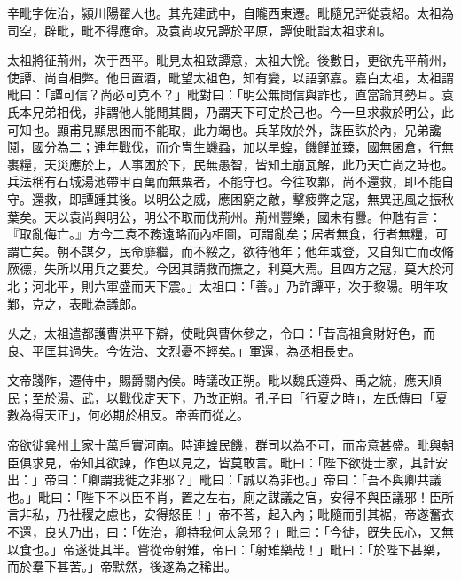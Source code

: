 \begin{pinyinscope}
 
 
 辛毗字佐治，潁川陽翟人也。其先建武中，自隴西東遷。毗隨兄評從袁紹。太祖為司空，辟毗，毗不得應命。及袁尚攻兄譚於平原，譚使毗詣太祖求和。
 
 
 太祖將征荊州，次于西平。毗見太祖致譚意，太祖大恱。後數日，更欲先平荊州，使譚、尚自相弊。他日置酒，毗望太祖色，知有變，以語郭嘉。嘉白太祖，太祖謂毗曰：「譚可信？尚必可克不？」毗對曰：「明公無問信與詐也，直當論其勢耳。袁氏本兄弟相伐，非謂他人能閒其間，乃謂天下可定於己也。今一旦求救於明公，此可知也。顯甫見顯思困而不能取，此力竭也。兵革敗於外，謀臣誅於內，兄弟讒鬩，國分為二；連年戰伐，而介冑生蟣蝨，加以旱蝗，饑饉並臻，國無囷倉，行無裹糧，天災應於上，人事困於下，民無愚智，皆知土崩瓦解，此乃天亡尚之時也。兵法稱有石城湯池帶甲百萬而無粟者，不能守也。今往攻鄴，尚不還救，即不能自守。還救，即譚踵其後。以明公之威，應困窮之敵，擊疲弊之寇，無異迅風之振秋葉矣。天以袁尚與明公，明公不取而伐荊州。荊州豐樂，國未有釁。仲虺有言：『取亂侮亡。』方今二袁不務遠略而內相圖，可謂亂矣；居者無食，行者無糧，可謂亡矣。朝不謀夕，民命靡繼，而不綏之，欲待他年；他年或登，又自知亡而改脩厥德，失所以用兵之要矣。今因其請救而撫之，利莫大焉。且四方之寇，莫大於河北；河北平，則六軍盛而天下震。」太祖曰：「善。」乃許譚平，次于黎陽。明年攻鄴，克之，表毗為議郎。
 
 
 
 
 乆之，太祖遣都護曹洪平下辯，使毗與曹休參之，令曰：「昔高祖貪財好色，而良、平匡其過失。今佐治、文烈憂不輕矣。」軍還，為丞相長史。
 
 
 
 
 文帝踐阼，遷侍中，賜爵關內侯。時議改正朔。毗以魏氏遵舜、禹之統，應天順民；至於湯、武，以戰伐定天下，乃改正朔。孔子曰「行夏之時」，左氏傳曰「夏數為得天正」，何必期於相反。帝善而從之。
 
 
 
 
 帝欲徙兾州士家十萬戶實河南。時連蝗民饑，群司以為不可，而帝意甚盛。毗與朝臣俱求見，帝知其欲諫，作色以見之，皆莫敢言。毗曰：「陛下欲徙士家，其計安出：」帝曰：「卿謂我徙之非邪？」毗曰：「誠以為非也。」帝曰：「吾不與卿共議也。」毗曰：「陛下不以臣不肖，置之左右，廁之謀議之官，安得不與臣議邪！臣所言非私，乃社稷之慮也，安得怒臣！」帝不荅，起入內；毗隨而引其裾，帝遂奮衣不還，良乆乃出，曰：「佐治，卿持我何太急邪？」毗曰：「今徙，旣失民心，又無以食也。」帝遂徙其半。嘗從帝射雉，帝曰：「射雉樂哉！」毗曰：「於陛下甚樂，而於羣下甚苦。」帝默然，後遂為之稀出。
 

\end{pinyinscope}
